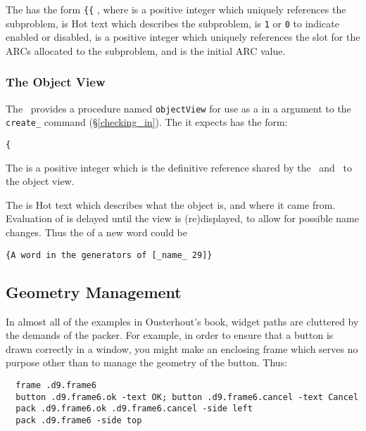 The  has the form {\tt\{\{}
   ,
where  is a positive integer which uniquely
references the subproblem,  is {\sf Hot} text which
describes the subproblem,  is {\tt 1} or {\tt 0} to
indicate enabled or disabled,  is a positive integer
which uniquely references the slot for the ARCs allocated to the
subproblem, and  is the initial ARC value.


\subsubsection{The Object View}

The \FE\ provides a procedure named {\tt objectView} for use as a
 in a  argument to the {\tt
create\_} command (\S\ref{checking_in}). The  it
expects has the form:

{\tt\{} 

The  is a positive integer which is the definitive
reference shared by the \FE\ and \SM\ to the object view.

The  is {\sf Hot} text which describes what the object
is, and where it came from. Evaluation of  is delayed
until the view is (re)displayed, to allow for possible name changes.
Thus the  of a new word could be

{\tt\{A word in the generators of [\_name\_ 29]\}}




\subsection{Geometry Management}

In almost all of the examples in Ousterhout's book, widget paths are
cluttered by the demands of the packer. For example, in order to
ensure that a button is drawn correctly in a window, you might make an
enclosing frame which serves no purpose other than to manage the
geometry of the button. Thus:

\begin{verbatim}
  frame .d9.frame6
  button .d9.frame6.ok -text OK; button .d9.frame6.cancel -text Cancel
  pack .d9.frame6.ok .d9.frame6.cancel -side left
  pack .d9.frame6 -side top
\end{verbatim}

